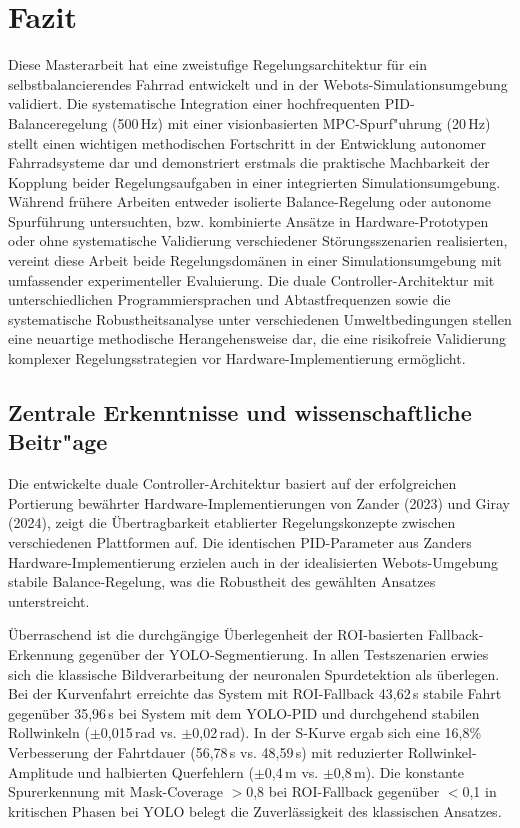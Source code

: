 \section{Fazit}

Diese Masterarbeit hat eine zweistufige Regelungsarchitektur für ein selbstbalancierendes Fahrrad entwickelt 
und in der Webots-Simulationsumgebung validiert. Die systematische Integration einer hochfrequenten PID-Balanceregelung 
(500\,Hz) mit einer visionbasierten MPC-Spurf{"u}hrung (20\,Hz) stellt einen wichtigen methodischen Fortschritt in der 
Entwicklung autonomer Fahrradsysteme dar und demonstriert erstmals die praktische Machbarkeit der Kopplung beider 
Regelungsaufgaben in einer integrierten Simulationsumgebung. Während frühere Arbeiten entweder isolierte Balance-Regelung 
\citep{astrom2005,andreo2009,lam2011} oder autonome Spurführung \citep{Hunziker2019} untersuchten, bzw. kombinierte Ansätze 
in Hardware-Prototypen \citep{aphiratsakun2013,kanjanawanishkul2015} oder ohne systematische Validierung verschiedener 
Störungsszenarien realisierten, vereint diese Arbeit beide Regelungsdomänen in einer Simulationsumgebung 
mit umfassender experimenteller Evaluierung. Die duale Controller-Architektur mit unterschiedlichen Programmiersprachen 
und Abtastfrequenzen sowie die systematische Robustheitsanalyse unter verschiedenen Umweltbedingungen stellen eine neuartige 
methodische Herangehensweise dar, die eine risikofreie Validierung komplexer Regelungsstrategien vor Hardware-Implementierung ermöglicht.

\subsection{Zentrale Erkenntnisse und wissenschaftliche Beitr{"a}ge}

Die entwickelte duale Controller-Architektur basiert auf der erfolgreichen Portierung bewährter Hardware-Implementierungen 
von Zander (2023) und Giray (2024), zeigt die Übertragbarkeit etablierter Regelungskonzepte zwischen verschiedenen 
Plattformen auf. Die identischen PID-Parameter aus Zanders Hardware-Implementierung erzielen auch in der idealisierten 
Webots-Umgebung stabile Balance-Regelung, was die Robustheit des gewählten Ansatzes unterstreicht.

Überraschend ist die durchgängige Überlegenheit der ROI-basierten 
Fallback-Erkennung gegenüber der YOLO-Segmentierung. In allen Testszenarien erwies sich die klassische Bildverarbeitung 
der neuronalen Spurdetektion als überlegen. Bei der Kurvenfahrt erreichte das System mit ROI-Fallback 43,62\,s stabile Fahrt 
gegenüber 35,96\,s bei System mit dem YOLO-PID und durchgehend stabilen Rollwinkeln ($\pm$0,015\,rad vs. $\pm$0,02\,rad). In der S-Kurve 
ergab sich eine 16,8\% Verbesserung der Fahrtdauer (56,78\,s vs. 48,59\,s) mit reduzierter Rollwinkel-Amplitude und 
halbierten Querfehlern ($\pm$0,4\,m vs. $\pm$0,8\,m). Die konstante Spurerkennung mit Mask-Coverage $>$0,8 bei ROI-Fallback 
gegenüber $<$0,1 in kritischen Phasen bei YOLO belegt die Zuverlässigkeit des klassischen Ansatzes.

